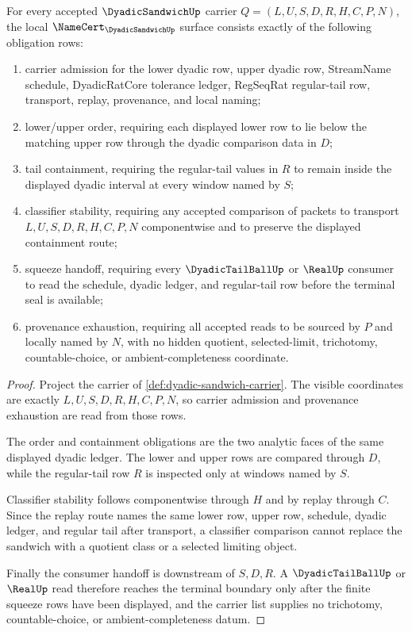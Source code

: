 \begin{theorem}
\label{thm:dyadic-sandwich-namecert-obligations}
For every accepted $\DyadicSandwichUp$ carrier $Q=(L,U,S,D,R,H,C,P,N)$, the local $\NameCert_{\DyadicSandwichUp}$ surface consists exactly of the following obligation rows:
\begin{enumerate}
\item carrier admission for the lower dyadic row, upper dyadic row, StreamName schedule, DyadicRatCore tolerance ledger, RegSeqRat regular-tail row, transport, replay, provenance, and local naming;
\item lower/upper order, requiring each displayed lower row to lie below the matching upper row through the dyadic comparison data in $D$;
\item tail containment, requiring the regular-tail values in $R$ to remain inside the displayed dyadic interval at every window named by $S$;
\item classifier stability, requiring any accepted comparison of packets to transport $L,U,S,D,R,H,C,P,N$ componentwise and to preserve the displayed containment route;
\item squeeze handoff, requiring every $\DyadicTailBallUp$ or $\RealUp$ consumer to read the schedule, dyadic ledger, and regular-tail row before the terminal seal is available;
\item provenance exhaustion, requiring all accepted reads to be sourced by $P$ and locally named by $N$, with no hidden quotient, selected-limit, trichotomy, countable-choice, or ambient-completeness coordinate.
\end{enumerate}
\end{theorem}
\begin{proof}
Project the carrier of \autoref{def:dyadic-sandwich-carrier}. The visible coordinates are exactly $L,U,S,D,R,H,C,P,N$, so carrier admission and provenance exhaustion are read from those rows.

The order and containment obligations are the two analytic faces of the same displayed dyadic ledger. The lower and upper rows are compared through $D$, while the regular-tail row $R$ is inspected only at windows named by $S$.

Classifier stability follows componentwise through $H$ and by replay through $C$. Since the replay route names the same lower row, upper row, schedule, dyadic ledger, and regular tail after transport, a classifier comparison cannot replace the sandwich with a quotient class or a selected limiting object.

Finally the consumer handoff is downstream of $S,D,R$. A $\DyadicTailBallUp$ or $\RealUp$ read therefore reaches the terminal boundary only after the finite squeeze rows have been displayed, and the carrier list supplies no trichotomy, countable-choice, or ambient-completeness datum.
\end{proof}

